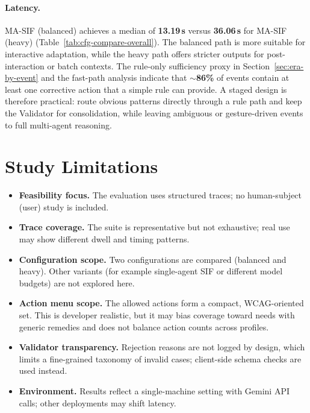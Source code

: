 \paragraph{Latency.}
MA-SIF (balanced) achieves a median of \textbf{13.19\,s} versus \textbf{36.06\,s} for MA-SIF (heavy) (Table~\ref{tab:cfg-compare-overall}). The balanced path is more suitable for interactive adaptation, while the heavy path offers stricter outputs for post-interaction or batch contexts. The rule-only sufficiency proxy in Section~\ref{sec:era-by-event} and the fast-path analysis indicate that \(\sim\)\textbf{86\%} of events contain at least one corrective action that a simple rule can provide. A staged design is therefore practical: route obvious patterns directly through a rule path and keep the Validator for consolidation, while leaving ambiguous or gesture-driven events to full multi-agent reasoning.

\section{Study Limitations}
\begin{itemize}
  \item \textbf{Feasibility focus.} The evaluation uses structured traces; no human-subject (user) study is included.
  \item \textbf{Trace coverage.} The suite is representative but not exhaustive; real use may show different dwell and timing patterns.
  \item \textbf{Configuration scope.} Two configurations are compared (balanced and heavy). Other variants (for example single-agent SIF or different model budgets) are not explored here.
  \item \textbf{Action menu scope.} The allowed actions form a compact, WCAG-oriented set. This is developer realistic, but it may bias coverage toward needs with generic remedies and does not balance action counts across profiles.
  \item \textbf{Validator transparency.} Rejection reasons are not logged by design, which limits a fine-grained taxonomy of invalid cases; client-side schema checks are used instead.
  \item \textbf{Environment.} Results reflect a single-machine setting with Gemini API calls; other deployments may shift latency.
\end{itemize}

